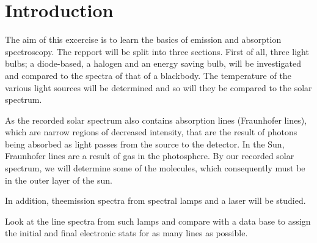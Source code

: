 \section{Introduction}

The aim of this excercise is to learn the basics of emission and absorption
spectroscopy. The repport will be split into three sections. First of all,
three light bulbs; a diode-based, a halogen and an energy saving bulb, will be
investigated and compared to the spectra of that of a blackbody. The
temperature of the various light sources will be determined and so will they be
compared to the solar spectrum. 

As the recorded solar spectrum also contains absorption lines (Fraunhofer lines), which are
narrow regions of decreased intensity, that are the result of
photons being absorbed as light passes from the source to the detector. In the
Sun, Fraunhofer lines are a result of gas in the photosphere. By our
recorded solar spectrum, we will determine some of the molecules, which
consequently must be in the outer layer of the sun. 

In addition, theemission spectra from spectral lamps and a laser will be studied.

Look at the line spectra from such lamps and compare with a data base to assign
the initial and final electronic stats for as many lines as possible. 



